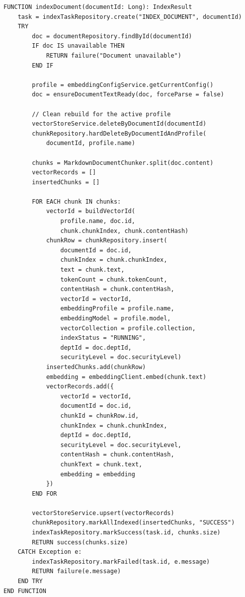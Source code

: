 \begin{table}[H]
\centering
\caption{Pseudocode --- indexDocument() RAG Document Parsing, Chunking, and Vector Upsert}
\label{tab:pseudocode-rag-index}
\vspace{2mm}

\begin{lstlisting}
FUNCTION indexDocument(documentId: Long): IndexResult
    task = indexTaskRepository.create("INDEX_DOCUMENT", documentId)
    TRY
        doc = documentRepository.findById(documentId)
        IF doc IS unavailable THEN
            RETURN failure("Document unavailable")
        END IF

        profile = embeddingConfigService.getCurrentConfig()
        doc = ensureDocumentTextReady(doc, forceParse = false)

        // Clean rebuild for the active profile
        vectorStoreService.deleteByDocumentId(documentId)
        chunkRepository.hardDeleteByDocumentIdAndProfile(
            documentId, profile.name)

        chunks = MarkdownDocumentChunker.split(doc.content)
        vectorRecords = []
        insertedChunks = []

        FOR EACH chunk IN chunks:
            vectorId = buildVectorId(
                profile.name, doc.id,
                chunk.chunkIndex, chunk.contentHash)
            chunkRow = chunkRepository.insert(
                documentId = doc.id,
                chunkIndex = chunk.chunkIndex,
                text = chunk.text,
                tokenCount = chunk.tokenCount,
                contentHash = chunk.contentHash,
                vectorId = vectorId,
                embeddingProfile = profile.name,
                embeddingModel = profile.model,
                vectorCollection = profile.collection,
                indexStatus = "RUNNING",
                deptId = doc.deptId,
                securityLevel = doc.securityLevel)
            insertedChunks.add(chunkRow)
            embedding = embeddingClient.embed(chunk.text)
            vectorRecords.add({
                vectorId = vectorId,
                documentId = doc.id,
                chunkId = chunkRow.id,
                chunkIndex = chunk.chunkIndex,
                deptId = doc.deptId,
                securityLevel = doc.securityLevel,
                contentHash = chunk.contentHash,
                chunkText = chunk.text,
                embedding = embedding
            })
        END FOR

        vectorStoreService.upsert(vectorRecords)
        chunkRepository.markAllIndexed(insertedChunks, "SUCCESS")
        indexTaskRepository.markSuccess(task.id, chunks.size)
        RETURN success(chunks.size)
    CATCH Exception e:
        indexTaskRepository.markFailed(task.id, e.message)
        RETURN failure(e.message)
    END TRY
END FUNCTION
\end{lstlisting}
\end{table}

